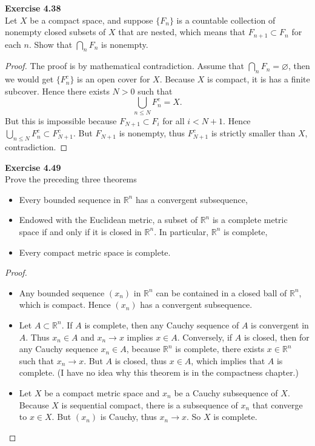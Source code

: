 \documentclass[12pt, a4paper]{article}
\theoremstyle{plain}
\newcommand{\R}{\mathbb{R}}
\newenvironment{exercise}[2][Exercise]
    { \begin{mdframed}[backgroundcolor=gray!20] \textbf{#1 #2} \\}
    {  \end{mdframed}}
\begin{document}
\begin{exercise}{4.38}
Let $X$ be a compact space, and suppose $\{F_n\}$ is a countable collection of nonempty closed subsets of $X$ that are nested, which means that $F_{n+1}\subset F_n$ for each $n$. Show that $\bigcap_n F_n$ is nonempty.
\end{exercise}
	\begin{proof}
	The proof is by mathematical contradiction. Assume that $\bigcap_nF_n=\varnothing$, then we would get $\{F_n^c\}$ is an open cover for $X$. Because $X$ is compact, it is has a finite subcover. Hence there exists $N>0$ such that
	\[
	\bigcup_{n\leq N}F_n^c=X.
	\]
	But this is impossible because $F_{N+1}\subset F_i$ for all $i<N+1$. Hence $\bigcup_{n\leq N}F_n^c\subset F_{N+1}^c$. But $F_{N+1}$ is nonempty, thus $F_{N+1}^c$ is strictly smaller than $X$, contradiction.
	\end{proof}

\begin{exercise}{4.49}
    Prove the preceding three theorems
    \begin{itemize}
        \item Every bounded sequence in $\R^n$ has a convergent subsequence,
        \item Endowed with the Euclidean metric, a subset of $\R^n$ is a complete metric space if and only if it is closed in $\R^n$. In particular, $\R^n$ is complete,
        \item Every compact metric space is complete.
    \end{itemize}
\end{exercise}
    \begin{proof}
        \hfill
        \begin{itemize}
            \item Any bounded sequence $(x_n)$ in $\R^n$ can be contained in a closed ball of $\R^n$, which is compact. Hence $(x_n)$ has a convergent subsequence.
            \item Let $A\subset \R^n$. If $A$ is complete, then any Cauchy sequence of $A$ is convergent in $A$. Thus $x_n\in A$ and $x_n\to x$ implies $x\in A$. Conversely, if $A$ is closed, then for any Cauchy sequence $x_n\in A$, because $\R^n$ is complete, there exists $x\in \R^n$ such that $x_n\to x$. But $A$ is closed, thus $x\in A$, which implies that $A$ is complete. (I have no idea why this theorem is in the compactness chapter.)
            \item Let $X$ be a compact metric space and $x_n$ be a Cauchy subsequence of $X$. Because $X$ is sequential compact, there is a subsequence of $x_n$ that converge to $x\in X$. But $(x_n)$ is Cauchy, thus $x_n\to x$. So $X$ is complete.
        \end{itemize}
    \end{proof}
	
\end{document}
